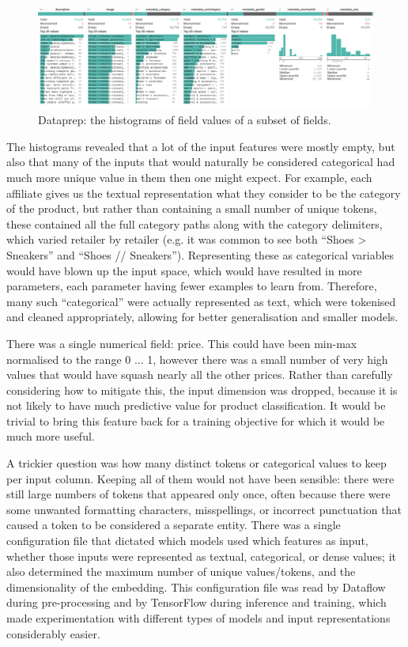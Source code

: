 \begin{figure}
  \hspace*{-0.2\textwidth}
  \includegraphics[width=1.4\textwidth]{figures/dataprep}
  \caption{Dataprep: the histograms of field values of a subset of fields.}
  \label{dataprep}
\end{figure}


The histograms revealed that a lot of the input features were mostly empty, but also that many of the inputs that would naturally be considered categorical  had much more unique value in them then one might expect.
For example, each affiliate gives us the textual representation what they consider to be the category of the product,  but  rather than containing a small number of unique tokens, these contained all the full category paths along with the category delimiters, which  varied retailer by retailer (e.g.  it was common to see both ``Shoes > Sneakers'' and ``Shoes // Sneakers'').
Representing these as categorical variables would have blown up the input space, which would have  resulted in more parameters, each parameter having fewer examples to learn from.
Therefore, many such ``categorical''  were actually represented as text, which were tokenised and cleaned appropriately, allowing for better generalisation and smaller models.

There was a single numerical field: price.
This could have been min-max normalised to the range 0 ... 1, however there  was a small number of very high values that would have squash nearly all the other  prices.
Rather than  carefully considering  how to mitigate this,  the input dimension was dropped, because it is not likely to have much predictive value for product classification.
It would be trivial to bring this feature back for a training objective for which it would be much more useful.

A trickier question was how many distinct tokens or categorical values to keep per input column.
Keeping all of them would not have been sensible: there were still large numbers of tokens that appeared only once, often because there were some unwanted formatting characters, misspellings, or incorrect punctuation that caused a token to be considered a separate entity.
There was a single configuration file that dictated which models used which features as input, whether those inputs were represented as textual, categorical, or dense values;  it also determined  the maximum number of unique values/tokens,  and the dimensionality of the embedding.
This configuration file was read by Dataflow during pre-processing  and by TensorFlow during  inference and training, which made experimentation with  different types of models and input representations considerably easier.

